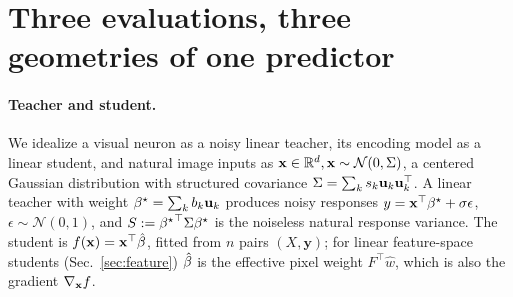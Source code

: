 

\vspace{-12pt}
\section{Three evaluations, three geometries of one predictor}
\label{sec:setup}

\paragraph{Teacher and student.}
We idealize a visual neuron as a noisy linear teacher, its encoding model as a linear student, and natural image inputs as $\mathbf{x}\in\mathbb{R}^d,\mathbf{x}\sim\mathcal N(0,\Sigma)$, a centered Gaussian distribution with structured covariance $\Sigma=\sum_ks_k{\mathbf{u}}_k{\mathbf{u}}_k^\top$.
A linear teacher with weight ${\beta^{\star}}=\sum_kb_k{\mathbf{u}}_k$ produces noisy responses $y=\mathbf{x}^\top{\beta^{\star}}+\sigma\epsilon$, $\epsilon\sim\mathcal{N}(0,1)$, and $S:={{\beta^{\star}}}^\top\Sigma{\beta^{\star}}$ is the noiseless natural response variance.
The student is $f(\mathbf{x})=\mathbf{x}^\top\hat{\beta}$, fitted from $n$ pairs $(X,\mathbf y)$; for linear feature-space students (Sec.~\ref{sec:feature}) $\hat{\beta}$ is the effective pixel weight $F^\top\hat w$, which is also the gradient $\nabla_{\mathbf{x}} f$.

